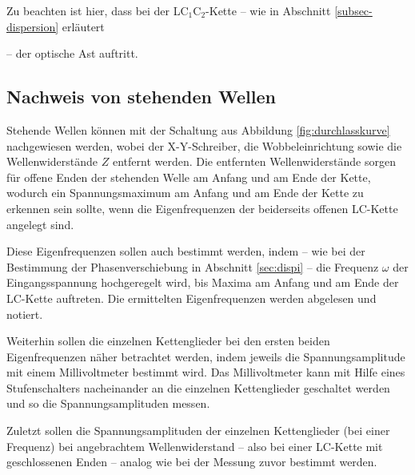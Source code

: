 Zu beachten ist hier, dass bei der LC$_1$C$_2$-Kette -- wie in Abschnitt \ref{subsec-dispersion} erläutert

-- der optische Ast auftritt.


\subsection{Nachweis von stehenden Wellen}

Stehende Wellen können mit der Schaltung aus Abbildung \ref{fig:durchlasskurve} nachgewiesen
werden, wobei der X-Y-Schreiber, die Wobbeleinrichtung sowie die Wellenwiderstände $Z$ entfernt
werden. Die entfernten Wellenwiderstände sorgen für offene Enden der stehenden Welle am Anfang
und am Ende der Kette, wodurch ein Spannungsmaximum am Anfang und am Ende der Kette zu erkennen
sein sollte, wenn die Eigenfrequenzen der beiderseits offenen LC-Kette angelegt sind.

Diese Eigenfrequenzen sollen auch bestimmt werden, indem -- wie bei der Bestimmung der Phasenverschiebung in Abschnitt \ref{sec:dispi} --
die Frequenz $\omega$ der Eingangsspannung hochgeregelt wird, bis Maxima am Anfang und am Ende der LC-Kette auftreten. Die ermittelten Eigenfrequenzen werden abgelesen und notiert.

Weiterhin sollen die einzelnen Kettenglieder bei den ersten beiden Eigenfrequenzen näher betrachtet werden, indem jeweils die Spannungsamplitude mit einem Millivoltmeter bestimmt wird.
Das Millivoltmeter kann mit Hilfe eines Stufenschalters nacheinander an die einzelnen
Kettenglieder geschaltet werden und so die Spannungsamplituden messen.

Zuletzt sollen die Spannungsamplituden der einzelnen Kettenglieder (bei einer Frequenz) bei angebrachtem Wellenwiderstand -- also bei einer LC-Kette mit geschlossenen Enden -- analog wie bei der Messung zuvor bestimmt werden.
